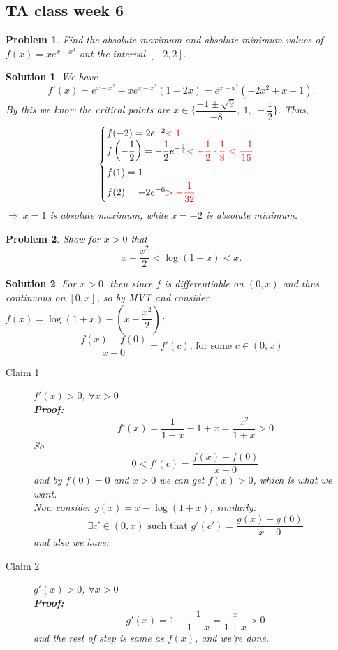 \documentclass[12pt,a4paper]{article}
\newcommand{\red}[1]{\textcolor{red}{#1}}
\theoremstyle{mystyle}
\numberwithin{figure}{subsection}
\newtheorem{prm}{Problem}[subsection] %
\newtheorem{sol}{Solution}[subsection]%
\newenvironment{pr}{\begin{prBox}\begin{prm}}{\end{prm}\end{prBox}}
\begin{document}
\subsection{TA class week 6}
\begin{pr}
Find the absolute maximum and absolute minimum values of $f(x)=xe^{x-x^2}$ ont the interval $[-2,2].$
\end{pr}
\begin{sol}
We have
\[f'(x) = e^{x-x^2}+xe^{x-x^2}(1-2x) = e^{x-x^2}(-2x^2+x+1).\]
By this we know the critical points are $x \in \{\dfrac{-1 \pm \sqrt{9}}{-8},\ 1, \ -\dfrac{1}{2}\}$. Thus,
\[
\begin{cases}
    f(-2) = 2e^{-2} \red{<1} \\
    \vspace{3pt}
    f\left(-\dfrac{1}{2}\right)=-\dfrac{1}{2}e^{-\frac{3}{4}} \textcolor{red}{<-\dfrac{1}{2}\cdot\dfrac{1}{8}<\dfrac{-1}{16}} \\
    \vspace{3pt}
    f(1)=1 \\
    f(2) = -2e^{-6} \red{>-\dfrac{1}{32}}
\end{cases}
\]
$\Rightarrow \ x=1$ is absolute maximum, while $x=-2$ is absolute minimum.
\end{sol}
\begin{pr}
    Show for $x>0$ that
    \[
    x-\dfrac{x^2}{2}<\log(1+x)<x.
    \]
\end{pr}
\begin{sol}
For $x>0$, then since $f$ is differentiable on $(0,x)$ and thus continuous on $[0,x]$, so by MVT and consider $f(x)=\log(1+x)-(x-\dfrac{x^2}{2})$:
\[
\dfrac{f(x)-f(0)}{x-0}=f'(c)\text{, for some }c \in (0,x)
\]
\begin{description}
    \item[Claim 1]$f'(x)>0$, $\forall x > 0$ \\
    \textbf{Proof:}
    \[
    f'(x) = \dfrac{1}{1+x}-1+x=\dfrac{x^2}{1+x}>0
    \]
    So
    \[
    0 < f'(c) = \dfrac{f(x)-f(0)}{x-0}
    \]
    and by $f(0)=0$ and $x>0$ we can get $f(x)>0$, which is what we want.\\
    Now consider $g(x) = x-\log(1+x)$, similarly:
    \[
    \exists c' \in (0,x) \text{ such that }g'(c') = \dfrac{g(x)-g(0)}{x-0}
    \]
    and also we have:
    \item[Claim 2]$g'(x) > 0$, $\forall x > 0$ \\
    \textbf{Proof:}
    \[
    g'(x) = 1 - \dfrac{1}{1+x} = \dfrac{x}{1+x} >0
    \]
    and the rest of step is same as $f(x)$,
    and we're done.  
\end{description}
\end{sol}
\end{document}
